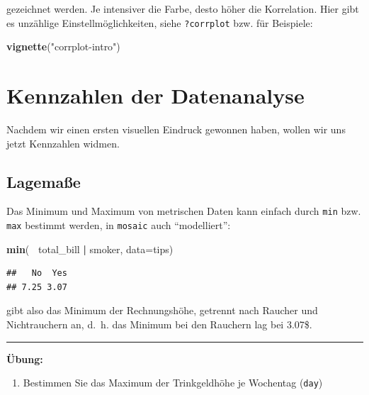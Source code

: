 \documentclass[12pt,ngerman,paper=a4,pagesize,DIV=13]{scrreprt}
\newenvironment{Shaded}{\begin{snugshade}}{\end{snugshade}}
\newcommand{\DataTypeTok}[1]{\textcolor[rgb]{0.13,0.29,0.53}{#1}}
\newcommand{\KeywordTok}[1]{\textcolor[rgb]{0.13,0.29,0.53}{\textbf{#1}}}
\newcommand{\NormalTok}[1]{#1}
\newcommand{\OperatorTok}[1]{\textcolor[rgb]{0.81,0.36,0.00}{\textbf{#1}}}
\newcommand{\StringTok}[1]{\textcolor[rgb]{0.31,0.60,0.02}{#1}}
\providecommand{\tightlist}{%
  \setlength{\itemsep}{0pt}\setlength{\parskip}{0pt}}
\begin{document}
gezeichnet werden. Je intensiver die Farbe, desto höher die Korrelation.
Hier gibt es unzählige Einstellmöglichkeiten, siehe \texttt{?corrplot}
bzw. für Beispiele:

\begin{Shaded}
\begin{Highlighting}[]
\KeywordTok{vignette}\NormalTok{(}\StringTok{"corrplot-intro"}\NormalTok{)}
\end{Highlighting}
\end{Shaded}

\hypertarget{kennzahlen-der-datenanalyse}{%
\section{Kennzahlen der
Datenanalyse}\label{kennzahlen-der-datenanalyse}}

Nachdem wir einen ersten visuellen Eindruck gewonnen haben, wollen wir
uns jetzt Kennzahlen widmen.

\hypertarget{lagemae}{%
\subsection{Lagemaße}\label{lagemae}}

Das Minimum und Maximum von metrischen Daten kann einfach durch
\texttt{min} bzw. \texttt{max} bestimmt werden, in \texttt{mosaic} auch
\enquote{modelliert}:

\begin{Shaded}
\begin{Highlighting}[]
\KeywordTok{min}\NormalTok{(}\OperatorTok{~}\StringTok{ }\NormalTok{total_bill }\OperatorTok{|}\StringTok{ }\NormalTok{smoker, }\DataTypeTok{data=}\NormalTok{tips)}
\end{Highlighting}
\end{Shaded}

\begin{verbatim}
##   No  Yes 
## 7.25 3.07
\end{verbatim}

gibt also das Minimum der Rechnungshöhe, getrennt nach Raucher und
Nichtrauchern an, d.~h. das Minimum bei den Rauchern lag bei 3.07\$.

\begin{center}\rule{0.5\linewidth}{\linethickness}\end{center}

\textbf{Übung:}

\begin{enumerate}
\def\labelenumi{\arabic{enumi}.}
\setcounter{enumi}{4}
\tightlist
\item
  Bestimmen Sie das Maximum der Trinkgeldhöhe je Wochentag
  (\texttt{day})
\end{enumerate}
\end{document}
